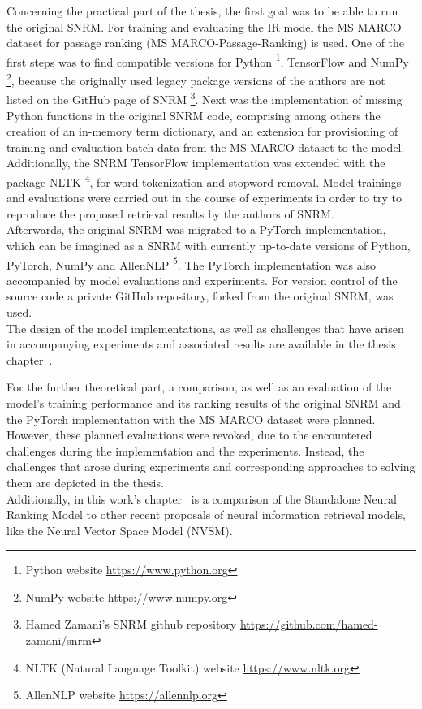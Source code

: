 Concerning the practical part of the thesis, the first goal was to be able 
    to run the original SNRM.
For training and evaluating the IR model the MS MARCO dataset
    for passage ranking (MS MARCO-Passage-Ranking) is used.
One of the first steps was to find compatible
    versions for Python 
    \footnote{Python website \url{https://www.python.org}}, 
    TensorFlow and NumPy
    \footnote{NumPy website \url{https://www.numpy.org}},
    because the originally used legacy package versions of the authors are not
    listed on the GitHub page of SNRM 
    \footnote{Hamed Zamani's SNRM github repository \url{https://github.com/hamed-zamani/snrm}}.
Next was the implementation of missing Python functions in the original SNRM code, 
    comprising among others the creation of an in-memory term dictionary,
    and an extension for provisioning of training and evaluation batch data from the 
    MS MARCO dataset to the model.
Additionally, the SNRM TensorFlow implementation was extended with the package NLTK
    \footnote{NLTK (Natural Language Toolkit) website \url{https://www.nltk.org}},
    for word tokenization and stopword removal.
Model trainings and evaluations were carried out in the course of experiments 
    in order to try to reproduce the proposed retrieval results by the authors of SNRM.\\
Afterwards, the original SNRM was migrated to a PyTorch implementation,
    which can be imagined as a SNRM with currently up-to-date versions of 
    Python, PyTorch, NumPy and AllenNLP
    \footnote{AllenNLP website \url{https://allennlp.org}}.
The PyTorch implementation was also accompanied by model evaluations and experiments.
For version control of the source code a private GitHub repository, forked from 
    the original SNRM, was used.\\
The design of the model implementations, as well as 
    challenges that have arisen in accompanying experiments and associated results 
    are available in the 
    thesis chapter~.

For the further theoretical part, a comparison, as well as an evaluation of the model's
    training performance and its ranking results of the original SNRM and 
    the PyTorch implementation with the MS MARCO dataset 
    were planned. 
However, these planned evaluations were revoked,
    due to the encountered challenges during the implementation and the experiments.
Instead, the challenges that arose during experiments 
    and corresponding approaches to solving them are depicted in the thesis.\\
Additionally, in this work's chapter~ 
    is a comparison of the Standalone Neural Ranking Model to other 
    recent proposals of neural information retrieval models,
    like the Neural Vector Space Model (NVSM).

